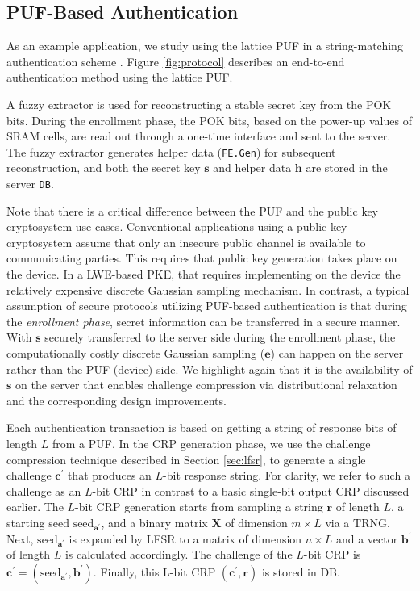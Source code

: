 \subsection{PUF-Based Authentication}
As an example application, we study using the lattice PUF in a string-matching authentication scheme \cite{suh2007physical}. 
Figure \ref{fig:protocol} describes an end-to-end authentication method using the lattice PUF. 

A fuzzy extractor \cite{bosch2008efficient} is used for reconstructing a stable secret key from the POK bits.
During the enrollment phase, the POK bits, based on the power-up values of SRAM cells, are read out through a one-time interface and sent to the server. The fuzzy extractor generates helper data (\texttt{FE.Gen})
for subsequent reconstruction, and both the secret key $\mathbf{s}$ and helper data $\mathbf{h}$ are stored in the server \texttt{DB}.

Note that there is a critical difference between the PUF and the public key cryptosystem use-cases. Conventional applications using a public key cryptosystem assume that only an insecure public channel is available to communicating parties. 
This requires that public key generation takes place on the device. In a LWE-based PKE, that requires implementing on the device the relatively expensive discrete Gaussian sampling mechanism. In contrast, a typical assumption of secure protocols utilizing PUF-based authentication is that during the \emph{enrollment phase}, secret information can be transferred in a secure manner. 
With $\mathbf{s}$ securely transferred to the server side during the enrollment phase, the computationally costly discrete Gaussian sampling ($\mathbf{e}$) can happen on the server rather than the PUF (device) side.
We highlight again that it is the availability of $\mathbf{s}$ on the server that enables challenge compression via distributional relaxation and the corresponding design improvements. 

Each authentication transaction is based on getting a string of response bits of length $L$ from a PUF. 
In the CRP generation phase, we use the challenge compression technique described in Section \ref{sec:lfsr}, to generate a single challenge $\mathbf{c}^\prime$ that produces an $L$-bit response string. 
For clarity, we refer to such a challenge as an $L$-bit CRP in contrast to a basic single-bit output CRP discussed earlier. 
The $L$-bit CRP generation starts from sampling a string $\mathbf{r}$ of length $L$, a starting seed $\text{seed}_{\mathbf{a}^\prime}$, and a binary matrix $\mathbf{X}$ of dimension $m\times L$ via a TRNG. 
Next, $\text{seed}_{\mathbf{a}^\prime}$ is expanded by LFSR to a matrix of dimension $n\times L$ and a vector $\mathbf{b}^\prime$ of length $L$ is calculated accordingly. 
The challenge of the $L$-bit CRP is $\mathbf{c}^\prime = (\text{seed}_{\mathbf{a}^\prime},\mathbf{b}^\prime)$.
Finally, this L-bit CRP $(\mathbf{c}^\prime, \mathbf{r})$ is stored in DB. 

